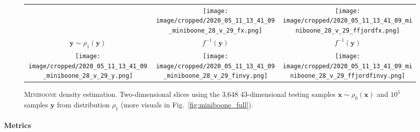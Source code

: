 \documentclass[letterpaper]{article}
\newcommand{\miniboone}{\textsc{Miniboone}}
\newcommand{\bfx}{\boldsymbol{x}}
\newcommand{\bfy}{\boldsymbol{y}}
\begin{document}
\begin{figure*}
{\begin{tabular}{ccc}
	   	&
	   	\texttt{[image: image/cropped/2020\_05\_11\_13\_41\_09\_miniboone\_28\_v\_29\_fx.png]}
	   	&
	   	\texttt{[image: image/cropped/2020\_05\_11\_13\_41\_09\_miniboone\_28\_v\_29\_ffjordfx.png]} \\
	   	$\bfy \sim \rho_1(\bfy)$ & $f^{-1}(\bfy)$ & $f^{-1}(\bfy)$\hspace{16pt} \\ 
	   	\texttt{[image: image/cropped/2020\_05\_11\_13\_41\_09\_miniboone\_28\_v\_29\_y.png]}
	   	&
	   	\texttt{[image: image/cropped/2020\_05\_11\_13\_41\_09\_miniboone\_28\_v\_29\_finvy.png]}
	   	&
	   	\texttt{[image: image/cropped/2020\_05\_11\_13\_41\_09\_miniboone\_28\_v\_29\_ffjordfinvy.png]}
	   	\end{tabular}%
	}%
    \caption{\miniboone{} density estimation.
    Two-dimensional slices using the 3,648 43-dimensional testing samples $\bfx \sim \rho_0(\bfx)$ and $10^5$ samples $\bfy$ from distribution $\rho_1$ (more visuals in Fig.~\ref{fig:miniboone_full}). 
    }
    \label{fig:miniboone}
\addtolength{\tabcolsep}{5pt} %
\end{figure*}



  
  
  
  
  
  
  
  
  
\paragraph{Metrics}
\end{document}
